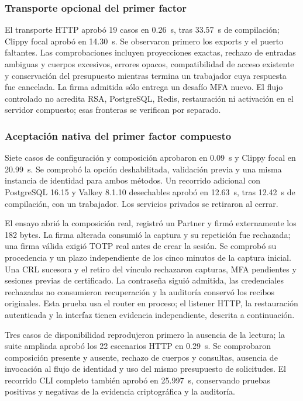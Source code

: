 \subsubsection{Transporte opcional del primer factor}

El transporte HTTP aprobó 19 casos en 0.26~s, tras 33.57~s de compilación;
Clippy focal aprobó en 14.30~s. Se observaron primero los exports y el puerto
faltantes. Las comprobaciones incluyen proyecciones exactas, rechazo de entradas
ambiguas y cuerpos excesivos, errores opacos, compatibilidad de acceso existente
y conservación del presupuesto mientras termina un trabajador cuya respuesta
fue cancelada. La firma admitida sólo entrega un desafío MFA nuevo. El flujo
controlado no acredita RSA, PostgreSQL, Redis, restauración ni activación en
el servidor compuesto; esas fronteras se verifican por separado.


\subsubsection{Aceptación nativa del primer factor compuesto}

Siete casos de configuración y composición aprobaron en 0.09~s y Clippy focal
en 20.99~s. Se comprobó la opción deshabilitada, validación previa y una misma
instancia de identidad para ambos métodos. Un recorrido adicional con
PostgreSQL 16.15 y Valkey 8.1.10 desechables aprobó en 12.63~s, tras 12.42~s
de compilación, con un trabajador. Los servicios privados se retiraron al cerrar.

El ensayo abrió la composición real, registró un Partner y firmó externamente
los 182 bytes. La firma alterada consumió la captura y su repetición fue
rechazada; una firma válida exigió TOTP real antes de crear la sesión. Se
comprobó su procedencia y un plazo independiente de los cinco minutos de la
captura inicial. Una CRL sucesora y el retiro del vínculo rechazaron capturas,
MFA pendientes y sesiones previas de certificado. La contraseña siguió admitida,
las credenciales rechazadas no consumieron recuperación y la auditoría conservó
los recibos originales. Esta prueba usa el router en proceso; el listener HTTP,
la restauración autenticada y la interfaz tienen evidencia independiente, descrita
a continuación.


Tres casos de disponibilidad reprodujeron primero la ausencia de la lectura;
la suite ampliada aprobó los 22 escenarios HTTP en 0.29~s. Se comprobaron
composición presente y ausente, rechazo de cuerpos y consultas, ausencia de
invocación al flujo de identidad y uso del mismo presupuesto de solicitudes.
El recorrido CLI completo también aprobó en 25.997~s, conservando pruebas
positivas y negativas de la evidencia criptográfica y la auditoría.


